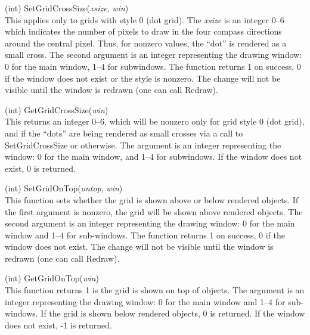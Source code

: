 \begin{description}
\item{(int) \vt SetGridCrossSize({\it xsize}, {\it win\/})}\\
This applies only to grids with style 0 (dot grid).  The {\it xsize}
is an integer 0--6 which indicates the number of pixels to draw in the
four compass directions around the central pixel.  Thus, for nonzero
values, the ``dot'' is rendered as a small cross.  The second argument
is an integer representing the drawing window:  0 for the main window,
1--4 for subwindows.  The function returns 1 on success, 0 if the
window does not exist or the style is nonzero.  The change will not be
visible until the window is redrawn (one can call {\vt Redraw}).

\item{(int) \vt GetGridCrossSize({\it win\/})}\\
This returns an integer 0--6, which will be nonzero only for grid
style 0 (dot grid), and if the ``dots'' are being rendered as small
crosses via a call to {\vt SetGridCrossSize} or otherwise.  The
argument is an integer representing the window:  0 for the main
window, and 1--4 for subwindows.  If the window does not exist, 0 is
returned.

\item{(int) \vt SetGridOnTop({\it ontop}, {\it win\/})}\\
This function sets whether the grid is shown above or below rendered
objects.  If the first argument is nonzero, the grid will be shown
above rendered objects.  The second argument is an integer
representing the drawing window:  0 for the main window and 1--4 for
sub-windows.  The function returns 1 on success, 0 if the window does
not exist.  The change will not be visible until the window is redrawn
(one can call {\vt Redraw}).

\item{(int) \vt GetGridOnTop({\it win\/})}\\
This function returns 1 is the grid is shown on top of objects.  The
argument is an integer representing the drawing window:  0 for the
main window and 1--4 for sub-windows.  If the grid is shown below
rendered objects, 0 is returned.  If the window does not exist, -1 is
returned.


\end{description}
